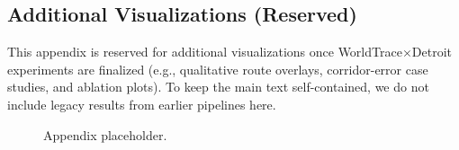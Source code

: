 
\subsection{Additional Visualizations (Reserved)}
This appendix is reserved for additional visualizations once WorldTrace$\times$Detroit experiments are finalized (e.g., qualitative route overlays, corridor-error case studies, and ablation plots). To keep the main text self-contained, we do not include legacy results from earlier pipelines here.

\begin{figure}[t]
  \centering
  \caption{Appendix placeholder.}
  \label{fig:appendix_placeholder}
\end{figure}
